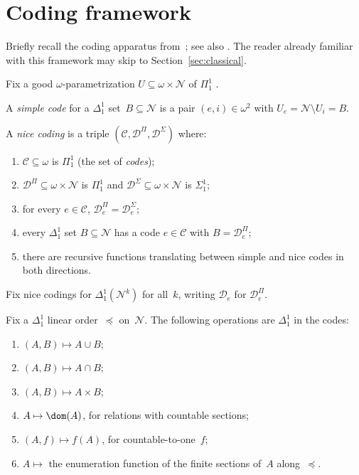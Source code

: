 \documentclass[12pt]{article}
\newcommand{\NN}{\mathcal{N}}
\newcommand{\CC}{\mathcal{C}}
\newcommand{\DD}{\mathcal{D}}
\begin{document}
\section{Coding framework}\label{sec:framework}

Briefly recall the coding apparatus from~\cite[Appendix~A]{thornton-thesis}; see also \cite[Section~4]{thornton2022algebraic}.
The reader already familiar with this framework may skip to Section~\ref{sec:classical}.

Fix a good $\omega$-parametrization $U\subseteq\omega\times\NN$ of $\Pi^1_1$ \cite[Theorem~A.5]{thornton2022algebraic}.

\begin{definition}\label{def:simple-nice-codes}
	A \emph{simple code} for a $\Delta^1_1$ set~$B\subseteq\NN$ is a pair $(e,i)\in\omega^2$ with $U_e = \NN\setminus U_i = B$.

	A \emph{nice coding} is a triple $(\CC,\DD^\Pi,\DD^\Sigma)$ where:
	\begin{enumerate}[label=(\roman*)]
		\item $\CC\subseteq\omega$ is $\Pi^1_1$ (the set of \emph{codes});
		\item $\DD^\Pi\subseteq\omega\times\NN$ is $\Pi^1_1$ and $\DD^\Sigma\subseteq\omega\times\NN$ is $\Sigma^1_1$;
		\item for every $e\in\CC$, $\DD^\Pi_e = \DD^\Sigma_e$;
		\item every $\Delta^1_1$ set $B\subseteq\NN$ has a code $e\in\CC$ with $B = \DD^\Pi_e$;
		\item there are recursive functions translating between simple and nice codes in both directions.
	\end{enumerate}
\end{definition}

Fix nice codings for $\Delta^1_1(\NN^k)$ for all~$k$, writing $\DD_e$ for $\DD^\Pi_e$.

\begin{lemma}\label{lemma:toolkit}
	Fix a $\Delta^1_1$ linear order~$\preceq$ on~$\NN$.
	The following operations are $\Delta^1_1$ in the codes:
	\begin{enumerate}[label=(\arabic*)]
		\item $(A,B)\mapsto A\cup B$;
		\item $(A,B)\mapsto A\cap B$;
		\item $(A,B)\mapsto A\times B$;
		\item $A\mapsto\dom(A)$, for relations with countable sections;
		\item $(A,f)\mapsto f(A)$, for countable-to-one~$f$;
		\item $A\mapsto$ the enumeration function of the finite sections of~$A$ along~$\preceq$.
	\end{enumerate}
\end{lemma}
\end{document}
